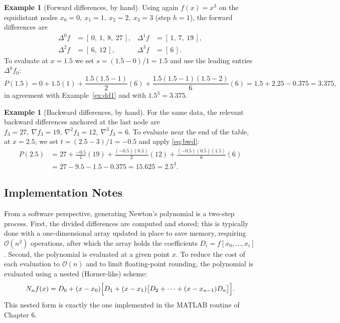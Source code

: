 \documentclass[12pt, a4paper]{article}
\theoremstyle{plain}
\theoremstyle{definition}
\newtheorem{example}[theorem]{Example}
\theoremstyle{remark}
\begin{document}
\begin{example}[Forward differences, by hand]\label{ex:fwd}
Using again $f(x) = x^3$ on the equidistant nodes $x_0 = 0,\ x_1 = 1,\ x_2 = 2,\ x_3 = 3$ (step $h = 1$), the forward differences are
\begin{align*}
    \Delta^0 f &= [\,0,\ 1,\ 8,\ 27\,], &
    \Delta^1 f &= [\,1,\ 7,\ 19\,], \\
    \Delta^2 f &= [\,6,\ 12\,], &
    \Delta^3 f &= [\,6\,].
\end{align*}
To evaluate at $x = 1.5$ we set $s = (1.5 - 0)/1 = 1.5$ and use the leading entries $\Delta^k f_0$:
\begin{equation*}
    P(1.5) = 0 + 1.5(1) + \frac{1.5(1.5-1)}{2}(6) + \frac{1.5(1.5-1)(1.5-2)}{6}(6) = 1.5 + 2.25 - 0.375 = 3.375,
\end{equation*}
in agreement with Example~\ref{ex:dd1} and with $1.5^3 = 3.375$.
\end{example}

\begin{example}[Backward differences, by hand]\label{ex:bwd}
For the same data, the relevant backward differences anchored at the last node are $f_3 = 27,\ \nabla f_3 = 19,\ \nabla^2 f_3 = 12,\ \nabla^3 f_3 = 6$. To evaluate near the end of the table, at $x = 2.5$, we set $t = (2.5 - 3)/1 = -0.5$ and apply \eqref{eq:bwd}:
\begin{align*}
    P(2.5) &= 27 + \frac{-0.5}{1}(19) + \frac{(-0.5)(0.5)}{2}(12) + \frac{(-0.5)(0.5)(1.5)}{6}(6) \\
           &= 27 - 9.5 - 1.5 - 0.375 = 15.625 = 2.5^3 .
\end{align*}
\end{example}

\subsection{Implementation Notes}

From a software perspective, generating Newton's polynomial is a two-step process. First, the divided differences are computed and stored; this is typically done with a one-dimensional array updated in place to save memory, requiring $\mathcal{O}(n^2)$ operations, after which the array holds the coefficients $D_i = f[x_0, \dots, x_i]$ \cite{micula5}. Second, the polynomial is evaluated at a given point $x$. To reduce the cost of each evaluation to $\mathcal{O}(n)$ and to limit floating-point rounding, the polynomial is evaluated using a nested (Horner-like) scheme:
\begin{equation}\label{eq:horner}
    N_n f(x) = D_0 + (x - x_0)\Bigl[D_1 + (x - x_1)\bigl[D_2 + \dots + (x - x_{n-1})D_n\bigr]\Bigr].
\end{equation}
This nested form is exactly the one implemented in the MATLAB routine of Chapter 6.
\end{document}
